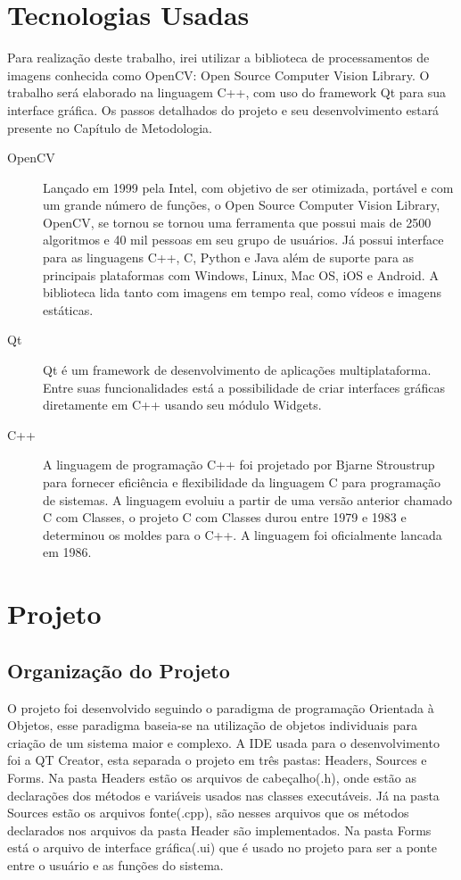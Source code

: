 \section{Tecnologias Usadas}
Para realização deste trabalho, irei utilizar a biblioteca de processamentos de imagens conhecida como OpenCV: Open Source Computer Vision Library. O trabalho será elaborado na linguagem C++, com uso do framework Qt para sua interface gráfica.
Os passos detalhados do projeto e seu desenvolvimento estará presente no Capítulo de Metodologia.
\begin{description}
	\item[OpenCV] Lançado em 1999 pela Intel\cite{Culjak:2012}, com objetivo de ser otimizada, portável e com um grande número de funções, o Open Source Computer Vision Library, OpenCV, se tornou se tornou uma ferramenta que possui mais de 2500 algoritmos e 40 mil pessoas em seu grupo de usuários\cite{Culjak:2012}. Já possui interface para as linguagens C++, C, Python e Java além de suporte para as principais plataformas com Windows, Linux, Mac OS, iOS e Android. A biblioteca lida tanto com imagens em tempo real, como vídeos e imagens estáticas.
	
	\item[Qt] Qt é um framework de desenvolvimento de aplicações multiplataforma. Entre suas funcionalidades está a possibilidade de criar interfaces gráficas diretamente em C++ usando seu módulo Widgets.
	
	\item [C++] A linguagem de programação C++ foi projetado por Bjarne Stroustrup para fornecer eficiência e flexibilidade da linguagem C para programação de sistemas. A linguagem evoluiu a partir de uma versão anterior chamado C com Classes, o projeto C com Classes durou entre 1979 e 1983 e determinou os moldes para o C++. A linguagem foi oficialmente lancada em 1986\cite{Stroustrup:1996}.
\end{description}

\section{Projeto}
\subsection{Organização do Projeto}
	 O projeto foi desenvolvido seguindo o paradigma de programação Orientada à Objetos, esse paradigma baseia-se na utilização de objetos individuais para criação de um sistema maior e complexo. A IDE usada para o desenvolvimento foi a QT Creator, esta separada o projeto em três pastas: Headers, Sources e Forms. Na pasta Headers estão os arquivos de cabeçalho(.h), onde estão as declarações dos métodos e variáveis usados nas classes  executáveis. Já na pasta Sources estão os arquivos fonte(.cpp), são nesses arquivos que os métodos declarados nos arquivos da pasta Header são implementados. Na pasta Forms está o arquivo de interface gráfica(.ui) que é usado no projeto para ser a ponte entre o usuário e as funções do sistema.
	 
